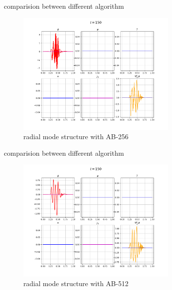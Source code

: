 \documentclass{beamer}
\begin{document}
\begin{frame}{comparision between different algorithm}
\begin{figure}[H]
	\centering
	\includegraphics[width=0.7\textwidth]{./images/ab-256-150.png}
	\caption{radial mode structure with AB-256}
\end{figure}
\end{frame}	
%
\begin{frame}{comparision between different algorithm}
\begin{figure}[H]
	\centering
	\includegraphics[width=0.7\textwidth]{./images/ab-512-150.png}
	\caption{radial mode structure with AB-512}
\end{figure}
\end{frame}	
%
%
\end{document}
